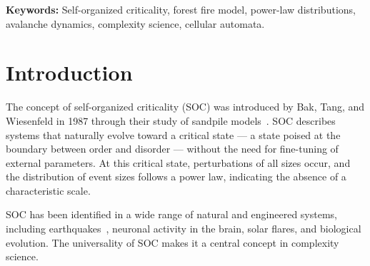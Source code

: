 \documentclass[12pt, a4paper, twocolumn]{article}
\begin{document}
\begin{abstract}
Self-organized criticality (SOC) is a property of dynamical systems that naturally evolve toward a critical state without external tuning.
In this work, we study the Drossel--Schwagl forest fire model as a canonical example of SOC.
We implement the model on a two-dimensional square lattice with periodic boundary conditions using Python and investigate the statistical properties of fire avalanches.
The system exhibits the three hallmarks of complexity: \textit{noise} (stochastic tree growth), \textit{avalanches} (fire cascades that burn connected tree clusters), and \textit{connectivity} (nearest-neighbour interactions on the lattice).
We compare two connectivity regimes --- Von~Neumann (4-neighbour) and Moore (8-neighbour) --- and find that the avalanche size distribution follows an approximate power law $P(s) \sim s^{-\tau}$ with exponents $\tau \approx 1.3$ in both cases.
Higher connectivity leads to larger mean avalanche sizes and lower steady-state tree density, but both regimes reach a self-organized critical state characterized by scale-free fire statistics and fluctuating tree density around a well-defined mean.
\end{abstract}

\textbf{Keywords:} Self-organized criticality, forest fire model, power-law distributions, avalanche dynamics, complexity science, cellular automata.

\section{Introduction}
\label{sec:intro}

The concept of self-organized criticality (SOC) was introduced by Bak, Tang, and Wiesenfeld in 1987 through their study of sandpile models~\citep{bak1987}.
SOC describes systems that naturally evolve toward a critical state --- a state poised at the boundary between order and disorder --- without the need for fine-tuning of external parameters.
At this critical state, perturbations of all sizes occur, and the distribution of event sizes follows a power law, indicating the absence of a characteristic scale.

SOC has been identified in a wide range of natural and engineered systems, including earthquakes~\citep{olami1992}, neuronal activity in the brain, solar flares, and biological evolution.
The universality of SOC makes it a central concept in complexity science.
\end{document}
